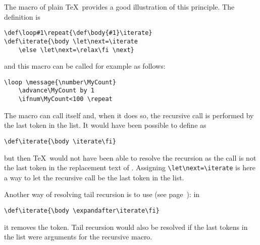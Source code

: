 \documentclass[letterpaper]{book}
\begin{document}
The  macro of plain \TeX\ provides a good illustration
\label{loop:ex}
of this principle. The definition is
\begin{verbatim}
\def\loop#1\repeat{\def\body{#1}\iterate}
\def\iterate{\body \let\next=\iterate
    \else \let\next=\relax\fi \next}
\end{verbatim}
and this macro can be called for example as follows:
\begin{verbatim}
\loop \message{\number\MyCount}
    \advance\MyCount by 1
    \ifnum\MyCount<100 \repeat
\end{verbatim}
The macro  can call itself and, when it does so,
the recursive call is performed by the last token in the list.
It would have been possible to define 
as
\begin{verbatim}
\def\iterate{\body \iterate\fi}
\end{verbatim}
but then \TeX\ would not have been able to resolve the recursion
as the call  is not the last token in the replacement
text of . Assigning \verb>\let\next=\iterate>
is here a way to let
the recursive call be the last token in the list.

Another way of resolving tail recursion is to use
 (see page~\pageref{after:cond}): in
\begin{verbatim}
\def\iterate{\body \expandafter\iterate\fi}
\end{verbatim}
it removes the  token.
Tail recursion would also be resolved if the last
tokens in the list were arguments for the
recursive macro.
\end{document}
